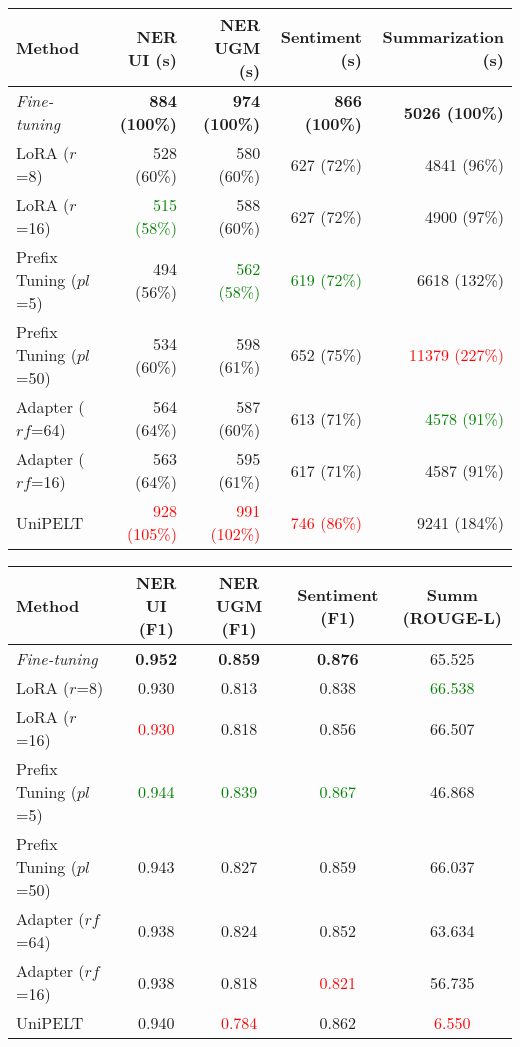 \begin{table*}[!ht]
    \centering
    \caption{Average Training Runtime (Top) \& Performance Metrics (Bottom)}
    \label{table:runtime-performance}
    \begin{tabular}{l|r|r|r|r}
        \toprule
        \textbf{Method} & \textbf{NER UI (s)} & \textbf{NER UGM (s)} & \textbf{Sentiment (s)} & \textbf{Summarization (s)} \\
        \midrule
        \textit{Fine-tuning} & \textbf{884 (100\%)} & \textbf{974 (100\%)} & \textbf{866 (100\%)} & \textbf{5026 (100\%)} \\
        LoRA ($r$=8) & 528 (60\%) & 580 (60\%) & 627 (72\%) & 4841 (96\%) \\
        LoRA ($r$=16) & \textcolor{Green}{515 (58\%)} & 588 (60\%) & 627 (72\%) & 4900 (97\%) \\
        Prefix Tuning ($pl$=5) & 494 (56\%) & \textcolor{Green}{562 (58\%)} & \textcolor{Green}{619 (72\%)} & 6618 (132\%) \\
        Prefix Tuning ($pl$=50) & 534 (60\%) & 598 (61\%) & 652 (75\%) & \textcolor{Red}{11379 (227\%)} \\
        Adapter ($rf$=64) & 564 (64\%) & 587 (60\%) & {613 (71\%)} & \textcolor{Green}{4578 (91\%)} \\
        Adapter ($rf$=16) & 563 (64\%) & 595 (61\%) & 617 (71\%) & 4587 (91\%) \\
        UniPELT & \textcolor{Red}{928 (105\%)} & \textcolor{Red}{991 (102\%)} & \textcolor{Red}{746 (86\%)} & 9241 (184\%) \\
        \bottomrule
    \end{tabular}

    \vspace{0.5cm}

    \begin{tabular}{l|c|c|c|c}
        \toprule
        \textbf{Method} & \textbf{NER UI (F1)} & \textbf{NER UGM (F1)} & \textbf{Sentiment (F1)} & \textbf{Summ (ROUGE-L)} \\
        \midrule
        \textit{Fine-tuning} & \textbf{0.952} & \textbf{0.859} & \textbf{0.876} & 65.525 \\
        LoRA ($r$=8) & {0.930} & 0.813 & 0.838 & \textcolor{Green}{66.538} \\
        LoRA ($r$=16) & \textcolor{Red}{0.930} & 0.818 & 0.856 & 66.507 \\
        Prefix Tuning ($pl$=5) & \textcolor{Green}{0.944} & \textcolor{Green}{0.839} & \textcolor{Green}{0.867} & 46.868 \\
        Prefix Tuning ($pl$=50) & 0.943 & 0.827 & 0.859 & 66.037 \\
        Adapter ($rf$=64) & 0.938 & 0.824 & 0.852 & 63.634 \\
        Adapter ($rf$=16) & 0.938 & 0.818 & \textcolor{Red}{0.821} & 56.735 \\
        UniPELT & 0.940 & \textcolor{Red}{0.784} & 0.862 & \textcolor{Red}{6.550} \\
        \bottomrule
    \end{tabular}
\end{table*}

